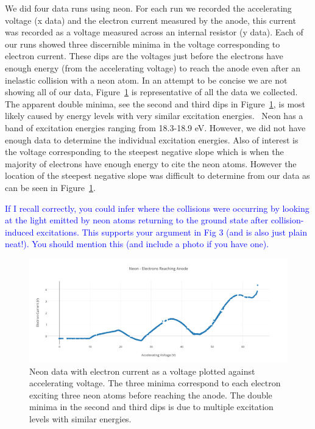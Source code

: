 \documentclass[prb,preprint]{revtex4-1}
\begin{document}
We did four data runs using neon. For each run we recorded the accelerating voltage (x data) and the electron current measured by the anode, this current was recorded as a voltage measured across an internal resistor (y data). Each of our runs showed three discernible minima in the voltage corresponding to electron current. These dips are the voltages just before the electrons have enough energy (from the accelerating voltage) to reach the anode even after an inelastic collision with a neon atom. In an attempt to be concise we are not showing all of our data, Figure~\ref{neon_data} is representative of all the data we collected. The apparent double minima, see the second and third dips in Figure~\ref{neon_data}, is most likely caused by energy levels with very similar excitation energies.~\cite{newfeatures} Neon has a band of excitation energies ranging from 18.3-18.9 eV. However, we did not have enough data to determine the individual excitation energies. Also of interest is the voltage corresponding to the steepest negative slope which is when the majority of electrons have enough energy to cite the neon atoms. However the location of the steepest negative slope was difficult to determine from our data as can be seen in Figure~\ref{neon_data}.

\textcolor{blue}{If I recall correctly, you could infer where the collisions were occurring by looking at the light emitted by neon atoms returning to the ground state after collision-induced excitations. This supports your argument in Fig 3 (and is also just plain neat!). You should mention this (and include a photo if you have one).}

\begin{figure}[h!]
\centering

\includegraphics[width=6in]{neon_data.pdf}
\caption{Neon data with electron current as a voltage plotted against accelerating voltage. The three minima correspond to each electron exciting three neon atoms before reaching the anode. The double minima in the second and third dips is due to multiple excitation levels with similar energies.}



\label{neon_data}
\end{figure}
\end{document}
